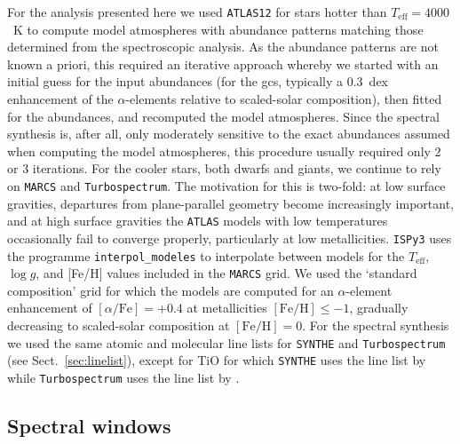 \documentclass{aa}
\begin{document}
For the analysis presented here we used \texttt{ATLAS12} for stars hotter than $T_\mathrm{eff}=4000$~K to compute model atmospheres with abundance patterns matching those determined from the spectroscopic analysis. As the abundance patterns are not known a priori, this required an iterative approach whereby we started with an initial guess for the input abundances (for the \acp{gc}, typically a 0.3~dex enhancement of the $\alpha$-elements relative to scaled-solar composition), then fitted for the abundances, and recomputed the model atmospheres.  Since the spectral synthesis is, after all, only moderately sensitive to the exact abundances assumed when computing the model atmospheres, this procedure usually required only 2 or 3 iterations. 
For the cooler stars, both dwarfs and giants, we continue to rely on \texttt{MARCS} and \texttt{Turbospectrum}. 
The motivation for this is two-fold: at low surface gravities, departures from plane-parallel geometry become increasingly important, and at high surface gravities the \texttt{ATLAS} models with low temperatures occasionally fail to converge properly, particularly at low metallicities. \texttt{ISPy3} uses the programme \texttt{interpol\_modeles} \citep{Masseron2006} to
interpolate between models for the $T_\mathrm{eff}$, $\log g$, and [Fe/H] values included in the \texttt{MARCS} grid. We used the `standard composition' grid for which the models are computed for an $\alpha$-element enhancement of $[\alpha/\mathrm{Fe}]=+0.4$ at metallicities $\mathrm{[Fe/H]}\leq-1$, gradually decreasing to scaled-solar composition at $\mathrm{[Fe/H]}=0$.
For the spectral synthesis we used the same atomic and molecular line lists for \texttt{SYNTHE} and \texttt{Turbospectrum} (see Sect.~\ref{sec:linelist}), except for TiO for which \texttt{SYNTHE} uses the line list by \citet{Schwenke1998} while \texttt{Turbospectrum} uses the line list by \citet{Plez1998}. 


\subsection{Spectral windows}
\label{sec:specwin}
\end{document}
